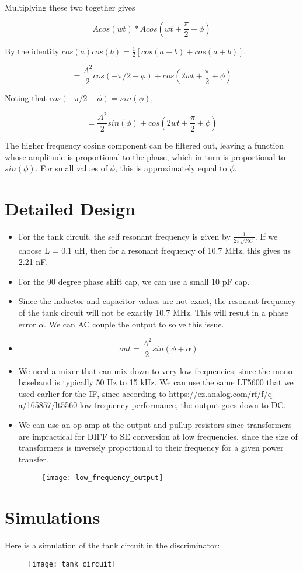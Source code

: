 \documentclass[12pt, letterpaper]{article}
\begin{document}
Multiplying these two together gives 

\[Acos(wt) * Acos(wt + \frac{\pi}{2} + \phi)\] 

By the identity \(cos(a)cos(b) = \frac{1}{2}[cos(a-b) + cos (a+b)] \),

\[= \frac{A^2}{2}cos(-\pi/2 - \phi) + cos(2wt + \frac{\pi}{2} + \phi)\] 

Noting that \(cos(-\pi/2 - \phi) = sin(\phi)\), 

\[= \frac{A^2}{2}sin(\phi) + cos(2wt + \frac{\pi}{2} + \phi)\] 

The higher frequency cosine component can be filtered out, leaving a function whose amplitude is proportional to the phase, which in turn is proportional to \(sin(\phi)\). For small values of \(\phi\), this is approximately equal to \(\phi\).



\section{Detailed Design}

\begin{itemize}
    \item For the tank circuit, the self resonant frequency is given by \( \frac{1}{2\pi \sqrt{RC}}\). If we choose L = 0.1 uH, then for a resonant frequency of 10.7 MHz, this gives us 2.21 nF. 
    \item For the 90 degree phase shift cap, we can use a small 10 pF cap. 
    \item Since the inductor and capacitor values are not exact, the resonant frequency of the tank circuit will not be exactly 10.7 MHz. This will result in a phase error \(\alpha\). We can AC couple the output to solve this issue.
    \item \[ out = \frac{A^2}{2}sin(\phi + \alpha) \]
    \item We need a mixer that can mix down to very low frequencies, since the mono baseband is typically 50 Hz to 15 kHz. We can use the same LT5600 that we used earlier for the IF, since according to \url{https://ez.analog.com/rf/f/q-a/165857/lt5560-low-frequency-performance}, the output goes down to DC.
    \item We can use an op-amp at the output and pullup resistors since transformers are impractical for DIFF to SE conversion at low frequencies, since the size of transformers is inversely proportional to their frequency for a given power transfer.
    \begin{figure}[h]
        \texttt{[image: low\_frequency\_output]}
    \end{figure}
\end{itemize}


\section{Simulations}
 
Here is a simulation of the tank circuit in the discriminator:



\begin{figure}[h]
    \texttt{[image: tank\_circuit]}
\end{figure}
\end{document}
